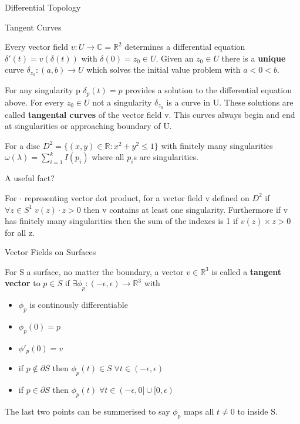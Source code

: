 \documentclass[12pt, letterpaper]{article}
\begin{document}
\begin{section}{Differential Topology}
  \begin{subsection}{Tangent Curves}

    Every vector field \(v: U \to \mathbb{C} = \mathbb{R}^{2}\) determines a
    differential equation \(\delta'(t) = v(\delta(t))\) with \(\delta(0) = z_{0}
    \in U\). Given an \(z_{0} \in U\) there is a \textbf{unique} curve \(\delta_{z_{0}}
    : (a, b) \to U\) which solves the initial value problem with \(a < 0 < b\).

    For any singularity p \(\delta_{p}(t) = p\) provides a solution to the
    differential equation above. For every \(z_{0} \in U\) not a singularity
    \(\delta_{z_{0}}\) is a curve in U. These solutions are called \textbf{tangental
      curves} of the vector field v. This curves always begin and end at
    singularities or approaching boundary of U.

    For a disc \(D^{2} = \{ (x, y) \in \mathbb{R} : x^{2} + y^{2} \leq 1\}\)
    with finitely many singularities \(\omega(\lambda) = \sum^{k}_{i = 1}I(p_{i})\)
    where all \(p_{i}\)s are singularities.

  \end{subsection}

  \begin{subsection}{A useful fact?}

    For \(\cdot\) representing vector dot product, for a vector field v defined
    on \(D^{2}\) if \(\forall z \in S^{1} \; v(z) \cdot z > 0\) then v contains
    at least one singularity. Furthermore if v has finitely many singularities
    then the sum of the indexes is 1 if \(v(z) \times z > 0\) for all z.

  \end{subsection}

  \begin{subsection}{Vector Fields on Surfaces}

    For S a surface, no matter the boundary, a vector \(v \in \mathbb{R}^{3}\)
    is called a \textbf{tangent vector} to \(p \in S\) if \(\exists \phi_{p}
    : (-\epsilon, \epsilon) \to \mathbb{R}^{3}\) with
    \begin{itemize}
      \item \(\phi_{p}\) is continously differentiable
      \item \(\phi_{p}(0) = p\)
      \item \(\phi'_{p}(0) = v\)
      \item if \(p \notin \partial S\) then \(\phi_{p}(t) \in S \;
            \forall t \in (-\epsilon,\epsilon)\)
      \item if \(p \in \partial S\) then \(\phi_{p}(t) \;
            \forall t \in (-\epsilon, 0] \cup [0, \epsilon)\)
    \end{itemize}
    The last two points can be summerised to say \(\phi_{p}\) maps all \(t \neq 0\)
    to inside S.


\end{subsection}
\end{section}
\end{document}
